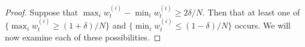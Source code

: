 \begin{proof}

Suppose that $\max_i w_t^{(i)} - \min_i w_t^{(i)} \geq 2\delta/N$. Then that at least one of $\{ \max_i w_t^{(i)} \geq (1+\delta)/N \}$ and $\{ \min_i w_t^{(i)} \leq (1-\delta)/N \}$ occurs. We will now examine each of these possibilities.


\end{proof}

